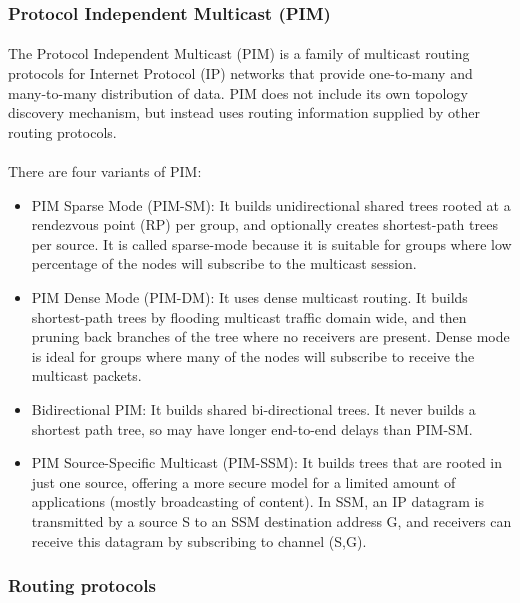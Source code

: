 \subsubsection*{Protocol Independent Multicast (PIM)\cite{PIMSM}\cite{PIMDM}}
\paragraph{}The Protocol Independent Multicast (PIM) is a family of multicast routing protocols for Internet Protocol (IP) networks that provide one-to-many and many-to-many distribution of data. PIM does not include its own topology discovery mechanism, but instead uses routing information supplied by other routing protocols.
\paragraph{}There are four variants of PIM:
\begin{itemize}
\item PIM Sparse Mode (PIM-SM): It builds unidirectional shared trees rooted at a rendezvous point (RP) per group, and optionally creates shortest-path trees per source. It is called sparse-mode because it is suitable for groups where low percentage of the nodes will subscribe to the multicast session.
\item PIM Dense Mode (PIM-DM): It uses dense multicast routing. It builds shortest-path trees by flooding multicast traffic domain wide, and then pruning back branches of the tree where no receivers are present. Dense mode is ideal for groups where many of the nodes will subscribe to receive the multicast packets.
\item Bidirectional PIM: It builds shared bi-directional trees. It never builds a shortest path tree, so may have longer end-to-end delays than PIM-SM.
\item PIM Source-Specific Multicast (PIM-SSM): It builds trees that are rooted in just one source, offering a more secure model for a limited amount of applications (mostly broadcasting of content). In SSM, an IP datagram is transmitted by a source S to an SSM destination address G, and receivers can receive this datagram by subscribing to channel (S,G).
\end{itemize}

\subsubsection{Routing protocols}

